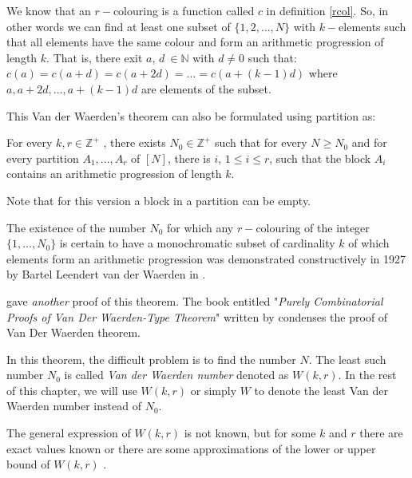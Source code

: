 
We know that an $r-$colouring is a function called $c$ in definition \eqref{rcol}. So, in other words we can find at least one subset of $\{1,2,\ldots,N\}$ with $k-$elements such that all elements have the same colour and form an arithmetic progression of length $k$. That is, there exit   $a$,  $d \ \in \mathbb{N}$ with $d\neq 0$ such that: $c(a)=c(a+d)=c(a+2d)=\ldots =c(a+(k-1)d)$ where $a, a+2d, \ldots, a+(k-1)d$ are elements of the subset.

This Van der Waerden's theorem can also be formulated using partition \citep{dransfield2004} as:

\begin{thm}
For every $k, r \in \mathbb{Z}^+$ , there exists $N_0 \in \mathbb{Z}^+$ such that for every $N \geq N_0$ and for every partition $A_1, \ldots , A_r$ of $[N]$, there is $i$, $1 \leq i \leq r$, such that the block $A_i$ contains an arithmetic progression of  length $k.$   \label{vd2}
\end{thm}

Note that for this version a block in a partition can be empty. 

The existence of the number $N_0$ for which any $r-$colouring of the integer $\{1, \ldots, N_0 \}$ is certain to have a monochromatic subset of cardinality $k$ of which elements form an arithmetic progression was demonstrated constructively in 1927 by Bartel Leendert van der Waerden in \cite{van1927beweis}.

\cite{graham1974short} gave \emph{another} proof of this theorem. The book entitled "\textit{Purely Combinatorial Proofs of Van Der Waerden-Type Theorem}" written by \cite{gasarch2010purely} condenses  the proof of Van Der Waerden theorem.


In this theorem, the difficult problem is to find the number $N$. The least such number $N_0$ is called \textit{Van der Waerden number} denoted as $W(k,r).$ In the rest of this chapter, we will use $W(k,r)$ or simply $W$ to denote the least Van der Waerden number instead of $N_0.$

The general expression of $W(k,r)$ is not known, but for some $k$ and $r$ there are exact values known or there are some approximations of the  lower or upper bound of $W(k,r)$  \citep{dransfield2004}.

